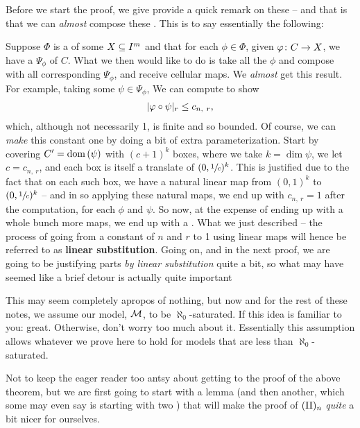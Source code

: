 Before we start the proof, we give provide a quick remark on these \cellrparams -- and that is that we can \emph{almost} compose these \cellrparams. This is to say essentially the following:

\begin{remark}
  Suppose $\Phi$ is a \cellrparam of some $\CIn[X]{m}$ and that for each $\phi \in \Phi$, given $\funcdom{\phi}{C}{X}$, we have a \cellrparam $\Psi_{\phi}$ of $C$. What we then would like to do is take all the $\phi$ and compose with all corresponding $\Psi_{\phi}$, and receive cellular maps. We \emph{almost} get this result. For example, taking some $\psi \in \Psi_{\phi}$, We can compute to show
    \begin{align*}
      \rnorm[r]{\phi \circ \psi} \leq c_{n, \ r},
    \end{align*}
    which, although not necessarily 1, is finite and so bounded. Of course, we can \emph{make} this constant one by doing a bit of extra parameterization. Start by covering $\pri{C} = \dom{\psi}$ with $(c + 1)^k$ boxes, where we take $k = \dim{\psi}$, we let $c = c_{n, \ r}$, and each box is itself a translate of $(0, \sfrac{1}{c})^k$. This is justified due to the fact that on each such box, we have a natural linear map from $(0, 1)^k$ to $(0, \sfrac{1}{c})^k$ -- and in so applying these natural maps, we end up with $c_{n, \ r} = 1$ after the computation, for each $\phi$ and $\psi$. So now, at the expense of ending up with a whole bunch more maps, we end up with a \cellrparam. What we just described -- the process of going from a constant of $n$ and $r$ to 1 using linear maps will hence be referred to as \textbf{linear substitution}. Going on, and in the next proof, we are going to be justifying parts \emph{by linear substitution} quite a bit, so what may have seemed like a brief detour is actually quite important
\end{remark}


\begin{remark}
This may seem completely apropos of nothing, but now and for the rest of these notes, we assume our model, $\M$, to be $\aleph_0$-saturated. If this idea is familiar to you: great. Otherwise, don't worry too much about it. Essentially this assumption allows whatever we prove here to hold for models that are less than $\aleph_0$-saturated.
\end{remark}

Not to keep the eager reader too antsy about getting to the proof of the above theorem, but we are first going to start with a lemma (and then another, which some may even say is starting with two \lemmas) that will make the proof of $\IIn$ \emph{quite} a bit nicer for ourselves.

